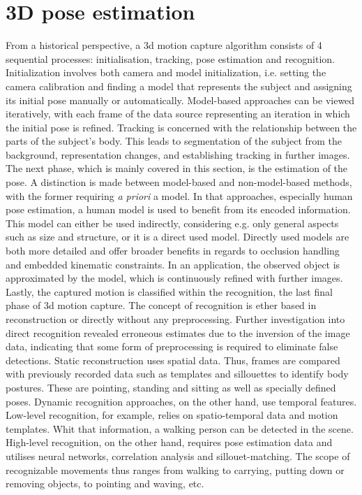 \section{3D pose estimation}
From a historical perspective, a 3d motion capture algorithm consists of 4 sequential processes: initialisation, tracking, pose estimation and recognition. Initialization involves both camera and model initialization, i.e. setting the camera calibration and finding a model that represents the subject and assigning its initial pose manually or automatically. Model-based approaches can be viewed iteratively, with each frame of the data source representing an iteration in which the initial pose is refined. Tracking is concerned with the relationship between the parts of the subject's body. This leads to segmentation of the subject from the background, representation changes, and establishing tracking in further images. The next phase, which is mainly covered in this section, is the estimation of the pose. A distinction is made between model-based and non-model-based methods, with the former requiring  \emph{a priori} a model. In that approaches, especially human pose estimation, a human model is used to benefit from its encoded information. This model can either be used indirectly, considering e.g. only general aspects such as size and structure, or it is a direct used model. Directly used models are both more detailed and offer broader benefits in regards to occlusion handling and embedded kinematic constraints. In an application, the observed object is approximated by the model, which is continuously refined with further images. Lastly, the captured motion is classified within the recognition, the last final phase of 3d motion capture. The concept of recognition is ether based in reconstruction or directly without any preprocessing. Further investigation \cite{sumi} into direct recognition revealed erroneous estimates due to the inversion of the image data, indicating that some form of preprocessing is required to eliminate false detections. Static reconstruction uses spatial data. Thus, frames are compared with previously recorded data such as templates and sillouettes to identify body postures. These are pointing, standing and sitting as well as specially defined poses. Dynamic recognition approaches, on the other hand, use temporal features. Low-level recognition, for example, relies on spatio-temporal data and motion templates. Whit that information, a walking person can be detected in the scene. High-level recognition, on the other hand, requires pose estimation data and utilises neural networks, correlation analysis and sillouet-matching. The scope of recognizable movements thus ranges from walking to carrying, putting down or removing objects, to pointing and waving, etc. \cite{summary80s}
